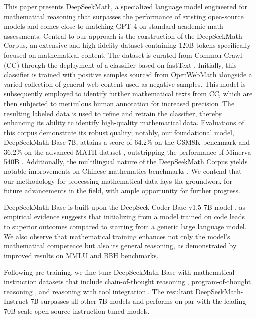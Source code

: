 This paper presents DeepSeekMath, a specialized language model engineered for mathematical reasoning that surpasses the performance of existing open-source models and comes close to matching GPT-4 on standard academic math assessments. Central to our approach is the construction of the DeepSeekMath Corpus, an extensive and high-fidelity dataset containing 120B tokens specifically focused on mathematical content. The dataset is curated from Common Crawl (CC) through the deployment of a classifier based on fastText \citep{joulin2016fasttext}. Initially, this classifier is trained with positive samples sourced from OpenWebMath \citep{openwebmath} alongside a varied collection of general web content used as negative samples. This model is subsequently employed to identify further mathematical texts from CC, which are then subjected to meticulous human annotation for increased precision. The resulting labeled data is used to refine and retrain the classifier, thereby enhancing its ability to identify high-quality mathematical data. Evaluations of this corpus demonstrate its robust quality; notably, our foundational model, DeepSeekMath-Base 7B, attains a score of 64.2\% on the GSM8K benchmark \citep{gsm8k} and 36.2\% on the advanced MATH dataset \citep{MATH}, outstripping the performance of Minerva 540B \citep{minerva}. Additionally, the multilingual nature of the DeepSeekMath Corpus yields notable improvements on Chinese mathematics benchmarks \citep{wei2023cmath,agieval}. We contend that our methodology for processing mathematical data lays the groundwork for future advancements in the field, with ample opportunity for further progress.

DeepSeekMath-Base is built upon the DeepSeek-Coder-Base-v1.5 7B model \citep{deepseek-coder}, as empirical evidence suggests that initializing from a model trained on code leads to superior outcomes compared to starting from a generic large language model. We also observe that mathematical training enhances not only the model’s mathematical competence but also its general reasoning, as demonstrated by improved results on MMLU \citep{mmlu} and BBH \citep{bbh} benchmarks.

Following pre-training, we fine-tune DeepSeekMath-Base with mathematical instruction datasets that include chain-of-thought reasoning \citep{cot}, program-of-thought reasoning \citep{pot,pal}, and reasoning with tool integration \citep{tora}. The resultant DeepSeekMath-Instruct 7B surpasses all other 7B models and performs on par with the leading 70B-scale open-source instruction-tuned models.

